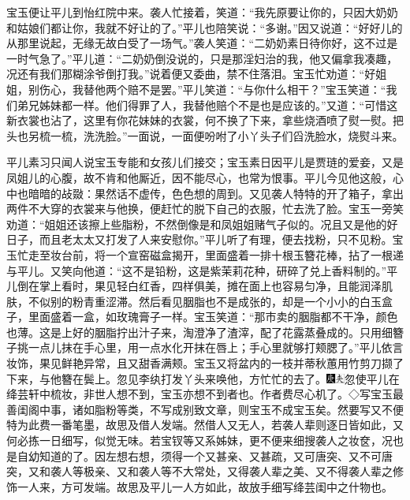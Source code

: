 宝玉便让平儿到怡红院中来。袭人忙接着，笑道：``我先原要让你的，只因大奶奶和姑娘们都让你，我就不好让的了。''平儿也陪笑说：``多谢。''因又说道：``好好儿的从那里说起，无缘无故白受了一场气。''袭人笑道：``二奶奶素日待你好，这不过是一时气急了。''平儿道：``二奶奶倒没说的，只是那淫妇治的我，他又偏拿我凑趣，况还有我们那糊涂爷倒打我。''说着便又委曲，禁不住落泪。宝玉忙劝道：``好姐姐，别伤心，我替他两个赔不是罢。''平儿笑道：``与你什么相干？''宝玉笑道：``我们弟兄姊妹都一样。他们得罪了人，我替他赔个不是也是应该的。''又道：``可惜这新衣裳也沾了，这里有你花妹妹的衣裳，何不换了下来，拿些烧酒喷了熨一熨。把头也另梳一梳，洗洗脸。''一面说，一面便吩咐了小丫头子们舀洗脸水，烧熨斗来。

平儿素习只闻人说宝玉专能和女孩儿们接交；宝玉素日因平儿是贾琏的爱妾，又是凤姐儿的心腹，故不肯和他厮近，因不能尽心，也常为恨事。平儿今见他这般，心中也暗暗的敁敠：果然话不虚传，色色想的周到。又见袭人特特的开了箱子，拿出两件不大穿的衣裳来与他换，便赶忙的脱下自己的衣服，忙去洗了脸。宝玉一旁笑劝道：``姐姐还该擦上些脂粉，不然倒像是和凤姐姐赌气子似的。况且又是他的好日子，而且老太太又打发了人来安慰你。''平儿听了有理，便去找粉，只不见粉。宝玉忙走至妆台前，将一个宣窑磁盒揭开，里面盛着一排十根玉簪花棒，拈了一根递与平儿。又笑向他道：``这不是铅粉，这是紫茉莉花种，研碎了兑上香料制的。''平儿倒在掌上看时，果见轻白红香，四样俱美，摊在面上也容易匀净，且能润泽肌肤，不似别的粉青重涩滞。然后看见胭脂也不是成张的，却是一个小小的白玉盒子，里面盛着一盒，如玫瑰膏子一样。宝玉笑道：``那市卖的胭脂都不干净，颜色也薄。这是上好的胭脂拧出汁子来，淘澄净了渣滓，配了花露蒸叠成的。只用细簪子挑一点儿抹在手心里，用一点水化开抹在唇上；手心里就够打颊腮了。''平儿依言妆饰，果见鲜艳异常，且又甜香满颊。宝玉又将盆内的一枝并蒂秋蕙用竹剪刀撷了下来，与他簪在鬓上。忽见李纨打发丫头来唤他，方忙忙的去了。{\includegraphics[width=3mm]{../Images/00004}\includegraphics[width=3mm]{../Images/00012}\footnotesize \kaishu 忽使平儿在绛芸轩中梳妆，非世人想不到，宝玉亦想不到者也。作者费尽心机了。◇写宝玉最善闺阁中事，诸如脂粉等类，不写成别致文章，则宝玉不成宝玉矣。然要写又不便特为此费一番笔墨，故思及借人发端。然借人又无人，若袭人辈则逐日皆如此，又何必拣一日细写，似觉无味。若宝钗等又系姊妹，更不便来细搜袭人之妆奁，况也是自幼知道的了。因左想右想，须得一个又甚亲、又甚疏，又可唐突、又不可唐突，又和袭人等极亲、又和袭人等不大常处，又得袭人辈之美、又不得袭人辈之修饰一人来，方可发端。故思及平儿一人方如此，故放手细写绛芸闺中之什物也。}

